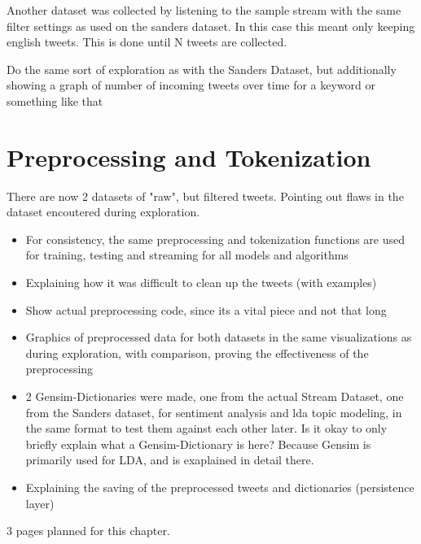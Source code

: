 Another dataset was collected by listening to the sample stream with the same filter settings as used on the sanders dataset.
In this case this meant only keeping english tweets.
This is done until N tweets are collected.

Do the same sort of exploration as with the Sanders Dataset, but additionally showing a graph of number of incoming tweets over time for a keyword or something like that

\section{Preprocessing and Tokenization}
\label{sec:preprocessingAndTokenization}

There are now 2 datasets of "raw", but filtered tweets.
Pointing out flaws in the dataset encoutered during exploration.

\begin{itemize}
    \item
    For consistency, the same preprocessing and tokenization functions are used for training, testing and streaming for all models and algorithms
    \item
    Explaining how it was difficult to clean up the tweets (with examples)
    \item
    Show actual preprocessing code, since its a vital piece and not that long
    \item
    Graphics of preprocessed data for both datasets in the same visualizations as during exploration, with comparison, proving the effectiveness of the preprocessing
    \item
    2 Gensim-Dictionaries were made, one from the actual Stream Dataset, one from the Sanders dataset, for sentiment analysis and lda topic modeling, in the same format to test them against each other later.
    Is it okay to only briefly explain what a Gensim-Dictionary is here?
    Because Gensim is primarily used for LDA, and is exaplained in detail there.
    \item
    Explaining the saving of the preprocessed tweets and dictionaries (persistence layer)
\end{itemize}

3 pages planned for this chapter.
\pagebreak[3]